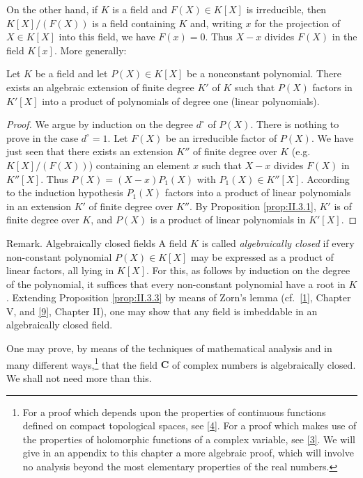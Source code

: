 On the other hand, if $K$ is a field and $F(X)\in K[X]$ is irreducible, then
$K[X]/(F(X))$ is a field containing $K$ and, writing $x$ for the projection
of $X\in K[X]$ into this field, we have $F(x)=0$. Thus $X-x$ divides $F(X)$
in the field $K[x]$. More generally:

\begin{proposition}
\label{prop:II.3.3}
Let $K$ be a field and let $P(X)\in K[X]$ be a nonconstant polynomial. There
exists an algebraic extension of finite degree $K'$ of $K$ such that $P(X)$
factors in $K'[X]$ into a product of polynomials of degree one (linear
polynomials).
\end{proposition}

\begin{proof}
We argue by induction on the degree $d^{\circ}$ of $P(X)$. There is nothing
to prove in the case $d^{\circ}=1$. Let $F(X)$ be an irreducible factor of
$P(X)$. We have just seen that there exists an extension $K''$ of finite
degree over $K$ (e.g.\ $K[X]/(F(X))$) containing an element $x$ such that
$X-x$ divides $F(X)$ in $K''[X]$. Thus $P(X)=(X-x)P_{1}(X)$ with
$P_{1}(X)\in K''[X]$. According to the induction hypothesis $P_{1}(X)$
factors into a product of linear polynomials in an extension $K'$ of finite
degree over $K''$. By Proposition \ref{prop:II.3.1}, $K'$ is of finite
degree over $K$, and $P(X)$ is a product of linear polynomials in $K'[X]$.
\end{proof}

\begin{statement}{Remark. Algebraically closed fields}
A field $K$ is called \emph{algebraically closed} if every non-constant
polynomial $P(X)\in K[X]$ may be expressed as a product of linear factors,
all lying in $K[X]$. For this, as follows by induction on the degree of the
polynomial, it suffices that every non-constant polynomial have a root in
$K$. Extending Proposition \ref{prop:II.3.3} by means of Zorn's lemma (cf.\
\hyperref[bib:1]{[1]}, Chapter V, and \hyperref[bib:9]{[9]}, Chapter II), one may show that any field is
imbeddable in an algebraically closed field.
\end{statement}

One may prove, by means of the techniques of mathematical analysis and in
many different ways,\footnote{For a proof which depends upon the properties of
continuous functions defined on compact topological spaces, see \hyperref[bib:4]{[4]}. For a
proof which makes use of the properties of holomorphic functions of a
complex variable, see \hyperref[bib:3]{[3]}. We will give in an appendix to this chapter a
more algebraic proof, which will involve no analysis beyond the most
elementary properties of the real numbers.} that the field $\mathbf{C}$ of
complex numbers is algebraically closed. We shall not need more than this.

